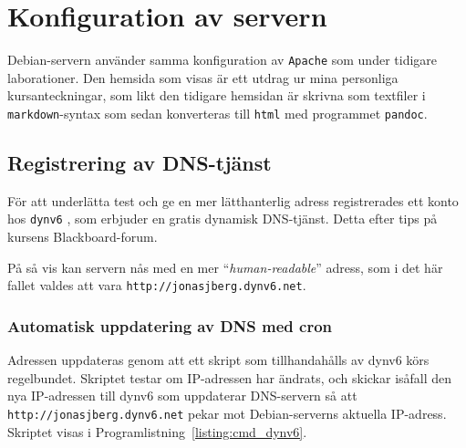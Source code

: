 %
%
%


\section{Konfiguration av servern}
Debian-servern använder samma konfiguration av \texttt{Apache} som under
tidigare laborationer. Den hemsida som visas är ett utdrag ur mina personliga
kursanteckningar, som likt den tidigare hemsidan är skrivna som textfiler i
\texttt{markdown}\cite{Gruber2013}-syntax som sedan konverteras till
\texttt{html} med programmet \texttt{pandoc}\cite{MacFarlane2013}.


\subsection{Registrering av DNS-tjänst}
För att underlätta test och ge en mer lätthanterlig adress registrerades ett
konto hos \texttt{dynv6} \cite{ipv6:dynv6}, som erbjuder en gratis dynamisk
DNS-tjänst. Detta efter tips på kursens Blackboard-forum.

På så vis kan servern nås med en mer ``\emph{human-readable}'' adress,
som i det här fallet valdes att vara \texttt{http://jonasjberg.dynv6.net}.

\subsubsection{Automatisk uppdatering av DNS med cron}
Adressen uppdateras genom att ett skript som tillhandahålls \cite{ipv6:dynv6sh}
av dynv6 körs regelbundet. Skriptet testar om IP-adressen har ändrats, och
skickar isåfall den nya IP-adressen till dynv6 som uppdaterar DNS-servern så
att \texttt{http://jonasjberg.dynv6.net} pekar mot Debian-serverns aktuella
IP-adress.  
Skriptet visas i Programlistning~\ref{listing:cmd_dynv6}.

